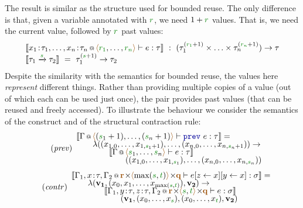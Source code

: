 The result is similar as the structure used for bounded reuse. The only difference is that, given
a variable annotated with $\cclrd{r}$, we need $1+\cclrd{r}$ values. That is, we need the current
value, followed by $\cclrd{r}$ past values:
%
\begin{equation*}
\begin{array}{l}
\sem{\coctx{x_1\!:\!\tau_1, \ldots, x_n\!:\!\tau_n}{ \alift{\cclrd{r_1}, \ldots, \cclrd{r_n}} } \vdash e : \tau} 
  ~:~ (\tau^{(\cclrd{r_1}+1)}_1 \times \ldots \times \tau^{(\cclrd{r_n}+1)}_n) \rightarrow \tau\\
\sem{\tau_1 \xrightarrow{\cclrd{s}} \tau_2} ~=~ \tau_1^{(\cclrd{s}+1)} \rightarrow \tau_2
\end{array}
\end{equation*}
%
Despite the similarity with the semantics for bounded reuse, the values here \emph{represent}
different things. Rather than providing multiple copies of a value (out of which each can be
used just once), the pair provides past values (that can be reused and freely accessed).
To illustrate the behaviour we consider the semantics of the  construct and of the
structural contraction rule:
%
\begin{equation*}
\hspace{-0.5em}
\tag{\emph{prev}}
\begin{array}{l}
\sem{\coctx{\Gamma}{\alift{(\cclrd{s}_1 + 1), \ldots, (\cclrd{s}_n + 1)}} \vdash \kvd{prev}~e : \tau} = \\[-0.25em]
  \qquad\lambda ((x_{1,0}, \ldots, x_{1,{\cclrd{s}_1 + 1}}), \ldots, (x_{n,0}, \ldots, x_{n,{\cclrd{s}_n + 1}})) \rightarrow \\[-0.25em]
\qquad\qquad\sem{\coctx{\Gamma}{\alift{\cclrd{s}_1, \ldots, \cclrd{s}_n}} \vdash e : \tau}\\[-0.25em]
\qquad\qquad\qquad ((x_{1,0}, \ldots, x_{1,\cclrd{s}_1}), \ldots, (x_{n,0}, \ldots, x_{n,\cclrd{s}_n}))
\end{array}
\end{equation*}
%
\begin{equation*}
\hspace{-0.5em}
\tag{\emph{contr}}
\begin{array}{l}
\sem{\coctx{\Gamma_1,x\!:\!\tau,\Gamma_2}{\aclrd{\textbf{r}} \cons \alift{\textnormal{max}(\cclrd{s},\cclrd{t})} \cons \aclrd{\textbf{q}}} \vdash \subst{\subst{e}{z}{x}}{y}{x} : \sigma} =\\[-0.25em] 
\qquad  \lambda(\mathbf{v_1}, (x_0, x_1, \ldots, x_{ \textnormal{max}(\cclrd{s},\cclrd{t}) }), \mathbf{v_2}) \rightarrow \\[-0.25em]
\qquad\qquad\sem{\coctx{\Gamma_1,y\!:\!\tau,z\!:\!\tau,\Gamma_2}{\aclrd{\textbf{r}} \cons \alift{\cclrd{s},\cclrd{t}} \cons \aclrd{\textbf{q}}} \vdash e : \sigma}\\[-0.25em]
\qquad\qquad\qquad (\mathbf{v_1}, (x_0, \ldots, x_{\cclrd{s}}), (x_0, \ldots, x_{\cclrd{t}} ), \mathbf{v_2})
\end{array}
\end{equation*}

